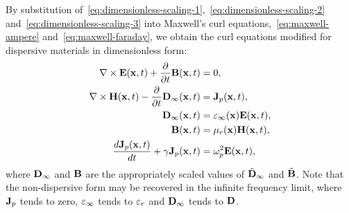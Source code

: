 By substitution of~\eqref{eq:dimensionless-scaling-1},~\eqref{eq:dimensionless-scaling-2} and~\eqref{eq:dimensionless-scaling-3} into Maxwell's curl equations,~\eqref{eq:maxwell-ampere} and~\eqref{eq:maxwell-faraday}, we obtain the curl equations modified for dispersive materials in dimensionless form:
\begin{subequations}
  \label{eq:dimensionless-maxwell}
  \begin{align}
    \nabla \times \mathbf{E}(\mathbf{x},t) + \frac{\partial}{\partial t} \mathbf{B}(\mathbf{x}, t) &= 0, \\
    \nabla \times \mathbf{H}(\mathbf{x},t) - \frac{\partial}{\partial t}  \mathbf{D}_{\infty}(\mathbf{x}, t) &=  \mathbf{J}_p(\mathbf{x},t), \\
    \mathbf{D}_{\infty}(\mathbf{x},t) &= \varepsilon_{\infty}(\mathbf{x}) \mathbf{E}(\mathbf{x},t), \\
    \mathbf{B}(\mathbf{x},t) &= \mu_r(\mathbf{x}) \mathbf{H}(\mathbf{x},t), \\
    \frac{d \mathbf{J}_p(\mathbf{x},t)}{dt} + \gamma \mathbf{J}_p(\mathbf{x},t) &= \omega_p^2 \mathbf{E}(\mathbf{x},t),
  \end{align}
\end{subequations}
where $\mathbf{D}_{\infty}$ and $\mathbf{B}$ are the appropriately scaled values of $\tilde{\mathbf{D}}_{\infty}$ and
$\tilde{\mathbf{B}}$. Note that the non-dispersive form may be recovered in the infinite
frequency limit, where $\mathbf{J}_p$ tends to zero, $\varepsilon_{\infty}$ tends to $\varepsilon_r$
and $\mathbf{D}_{\infty}$ tends to $\mathbf{D}$.

